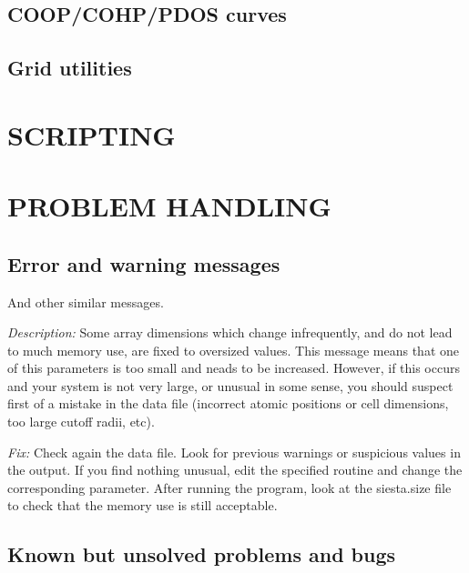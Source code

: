 \documentclass[11pt]{article}
\begin{document}
\subsection{COOP/COHP/PDOS curves}
\subsection{Grid utilities}

\section{SCRIPTING}

\section{PROBLEM HANDLING}

\subsection{Error and warning messages}

\begin{description}
\itemsep 10pt
\parsep 0pt

\item[{\tt chkdim: ERROR: In {\it routine} dimension {\it parameter} =
{\it value}. It must be  ...}]

And other similar messages.

{\it Description:}
Some array dimensions which change infrequently, and do not lead to
much memory use, are fixed to oversized values. This message means that
one of this parameters is too small and neads to be increased.
However, if this occurs and your system is not very large, or unusual in
some sense, you should suspect first of a mistake in the data file (incorrect
atomic positions or cell dimensions, too large cutoff radii, etc).

{\it Fix:}
Check again the data file. 
Look for previous warnings or suspicious values in the output.
If you find nothing unusual, edit the specified routine and change the 
corresponding parameter.
After running the program, look at the siesta.size file to check that
the memory use is still acceptable.

\end{description}



\subsection{Known but unsolved problems and bugs}
\end{document}
